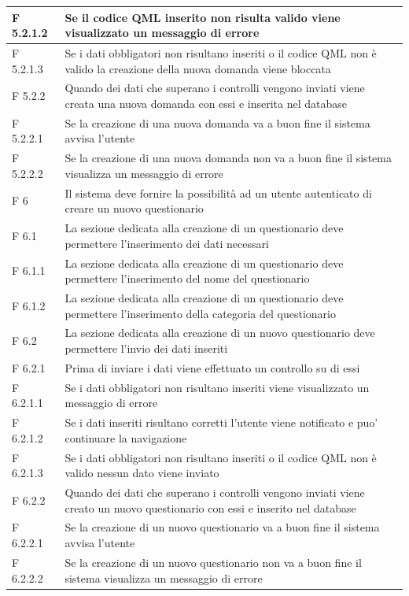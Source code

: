 \documentclass[a4paper,11pt]{article}
\begin{document}
\begin{longtable}{p{}p{}}
\midrule
F 5.2.1.2 & Se il codice QML inserito non risulta valido viene visualizzato un messaggio di errore\\
\midrule
F 5.2.1.3 & Se i dati obbligatori non risultano inseriti o il codice QML non è valido la creazione della nuova domanda viene bloccata\\
\midrule
F 5.2.2 & Quando dei dati che superano i controlli vengono inviati viene creata una nuova domanda con essi e inserita nel database\\
\midrule
F 5.2.2.1 & Se la creazione di una nuova domanda va a buon fine il sistema avvisa l'utente\\
\midrule
F 5.2.2.2 & Se la creazione di una nuova domanda non va a buon fine il sistema visualizza un messaggio di errore\\
\midrule
F 6 & Il sistema deve fornire la possibilità ad un utente autenticato di creare un nuovo questionario\\
\midrule
F 6.1 & La sezione dedicata alla creazione di un questionario deve permettere l'inserimento dei dati necessari\\
\midrule
F 6.1.1 & La sezione dedicata alla creazione di un questionario deve permettere l'inserimento del nome del questionario\\
\midrule
F 6.1.2 & La sezione dedicata alla creazione di un questionario deve permettere l'inserimento della categoria del questionario\\
\midrule
F 6.2 & La sezione dedicata alla creazione di un nuovo questionario deve permettere l'invio dei dati inseriti\\
\midrule
F 6.2.1 & Prima di inviare i dati viene effettuato un controllo su di essi\\
\midrule
F 6.2.1.1 & Se i dati obbligatori non risultano inseriti viene visualizzato un messaggio di errore\\
\midrule
F 6.2.1.2 & Se i dati inseriti risultano corretti l'utente viene notificato e puo' continuare la navigazione\\
\midrule
F 6.2.1.3 & Se i dati obbligatori non risultano inseriti o il codice QML non è valido nessun dato viene inviato\\
\midrule
F 6.2.2 & Quando dei dati che superano i controlli vengono inviati viene creato un nuovo questionario con essi e inserito nel database\\
\midrule
F 6.2.2.1 & Se la creazione di un nuovo questionario va a buon fine il sistema avvisa l'utente\\
\midrule
F 6.2.2.2 & Se la creazione di un nuovo questionario non va a buon fine il sistema visualizza un messaggio di errore\\

\end{longtable}
\end{document}
